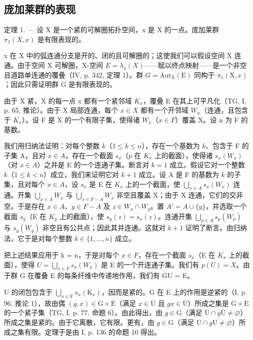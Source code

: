 \subsection{庞加莱群的表现}

定理 1. --- 设 X 是一个紧的可解圈拓扑空间，x 是 X 的一点。庞加莱群 \(\pi_{1}(X,x)\) 是有限表现的。

x 在 X 中的弧连通分支是开的、闭的且可解圈的；这使我们可以假设空间 X 连通。由于空间 X 可解圈，X-空间 \(E = \lambda_{x}(X)\)——赋以终点映射——是一个非空且道路单连通的覆叠（IV, p. 342, 定理 1）。群 \(G = \text{Aut}_{\text{X}}(\text{E})\) 同构于 \(\pi_{1}(\text{X}, x)\)；因此只需证明群 G 是有限表现的。

由于 X 紧，X 的每一点 x 都有一个紧邻域 \(K_{x}\)，覆叠 E 在其上可平凡化（TG, I, p. 65, 推论）。由于 X 局部连通，每个 \(x \in X\) 都有一个开邻域 \(W_{x}\)（连通，且包含于 \(K_{x}\)）。设 F 是 X 的一个有限子集，使得诸 \(W_{x}\)（\(x \in F\)）覆盖 X。设 n 为 F 的基数。

我们用归纳法证明：对每个整数 \(k\)（\(1 \leqslant k \leqslant n\)），存在一个基数为 \(k\)、包含于 F 的子集 A，且对 \(x \in A\)，存在一个截面 \(s_x\)（\(p\) 在 \(K_x\) 上的截面），使得诸 \(s_x(W_x)\)（对 \(x \in A\)）之并是 E 的一个连通子集。断言对 \(k = 1\) 成立。假设它对一个整数 \(k\)（\(1 \leqslant k < n\)）成立，我们来证明它对 \(k + 1\) 成立。设 A 是 F 的基数为 \(k\) 的子集，且对每个 \(x \in A\)，设 \(s_x\) 是 E 在 \(K_x\) 上的一个截面，使 \(\bigcup_{x \in A} s_x(W_x)\) 连通。开集 \(\bigcup_{x \in A} W_x\) 与 \(\bigcup_{x \in F-A} W_x\) 非空且覆盖 X；由于 X 连通，它们的交非空。于是存在 \(x \in A\)、\(y \in F - A\) 及 \(z \in W_x \cap W_y\)。置 \(A' = A \cup \{y\}\)，并选取一个截面 \(s_y\)（E 在 \(K_y\) 上的截面），使 \(s_y(z) = s_x(z)\)。连通开集 \(\bigcup_{p \in A} s_p(W_p)\) 与 \(s_y(W_y)\) 非空且有公共点；因此其并连通。这就对 \(k + 1\) 证明了断言。由归纳法，它于是对每个整数 \(k \in \{1, \ldots, n\}\) 成立。

把上述结果应用于 k = n，于是对每个 \(x \in F\)，存在一个截面 \(s_x\)（E 在 \(K_x\) 上的截面），使得 \(U = \bigcup_{x \in F} s_x(W_x)\) 是 E 的一个开连通子集。我们有 \(p(U) = X\)。由于群 G 在覆叠 E 的每条纤维中传递地作用，我们有 GU = E。

U 的闭包包含于 \(\bigcup_{x\in\mathrm{F}}s_x(\mathrm{K}_x)\)，因而是紧的。G 在 E 上的作用是逆紧的（I, p. 96, 推论 1），故由偶 \((g,x)\in\mathrm{G}\times\mathrm{E}\)（满足 \(x\in\overline{\mathrm{U}}\) 且 \(gx\in\overline{\mathrm{U}}\)）所成之集是 \(\mathrm{G}\times\mathrm{E}\) 的一个紧子集（TG, I, p. 77, 命题 6）。由此得出，由 \(g\in\mathrm{G}\)（满足 \(\overline{\mathrm{U}}\cap g\overline{\mathrm{U}}\neq\varnothing\)）所成之集是紧的。由于它离散，它有限。更有，由 \(g\in\mathrm{G}\)（满足 \(\mathrm{U}\cap g\mathrm{U}\neq\varnothing\)）所成之集有限。定理于是由 I, p. 136 的命题 10 得出。

